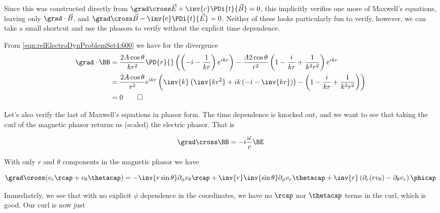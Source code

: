 Since this was constructed directly from $\grad \cross \vec{E} +\inv{c} \PDi{t}{\vec{B}} = 0$, this implicitly verifies one more of Maxwell's equations, leaving only $\grad \cdot \vec{B}$, and $\grad \cross \vec{B} -\inv{c} \PDi{t}{\vec{E}} = 0$.  Neither of these looks particularly fun to verify, however, we can take a small shortcut and use the phasors to verify without the explicit time dependence.

From \ref{eqn:relElectroDynProblemSet4:600} we have for the divergence
\begin{align*}
\grad \cdot \BB 
&=
\frac{2 A \cos\theta}{k r^2 } 
\PD{r}{} \left(
\left( -i - \frac{1}{kr} \right) e^{i k r} 
\right)
- \frac{A 2 \cos\theta}{r^2} \left( 1 - \frac{i}{k r} + \frac{1}{k^2 r^2} \right) e^{i k r}  \\
&=
\frac{2 A \cos\theta}{r^2 } e^{i k r}
\left(
\inv{k}\left( \inv{k r^2} + i k \left(-i - \inv{k r}\right)
\right)
-
\left( 1 - \frac{i}{k r} + \frac{1}{k^2 r^2} \right) 
\right) \\
&= 0 \qquad \square
\end{align*}

Let's also verify the last of Maxwell's equations in phasor form.  The time dependence is knocked out, and we want to see that taking the curl of the magnetic phasor returns us (scaled) the electric phasor.  That is

\begin{equation}\label{eqn:relElectroDynProblemSet4:620}
\grad \cross \BB = - i \frac{\omega}{c} \BE
\end{equation}

With only $r$ and $\theta$ components in the magnetic phasor we have

\begin{equation}\label{eqn:relElectroDynProblemSet4:n}
\grad \cross (v_r \rcap + v_\theta \thetacap) 
=
-\inv{r \sin\theta} 
\partial_\phi v_\theta
\rcap
+
\inv{r } 
\inv{\sin\theta} \partial_\phi v_r 
\thetacap
+
\inv{r } \left(
\partial_r (r v_\theta) - \partial_\theta v_r
\right) \phicap
\end{equation}

Immediately, we see that with no explicit $\phi$ dependence in the coordinates, we have no $\rcap$ nor $\thetacap$ terms in the curl, which is good.  Our curl is now just

